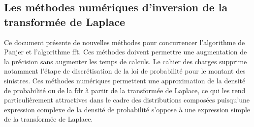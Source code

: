 \subsection{Les méthodes numériques d'inversion de la transformée de Laplace}\label{Chapter1Section1Subsection4}
Ce document présente de nouvelles méthodes pour concurrencer l'algorithme de Panjer et l'algorithme \gls{fft}. Ces méthodes doivent permettre une augmentation de la précision sans augmenter les temps de calculs. Le cahier des charges supprime notamment l'étape de discrétisation de la loi de probabilité pour le montant des sinistres. Ces méthodes numériques permettent une approximation de la densité de probabilité ou de la \gls{fdr} à partir de la transformée de Laplace, ce qui les rend particulièrement attractives dans le cadre des distributions composées puisqu'une expression complexe de la densité de probabilité s'oppose à une expression simple de la transformée de Laplace.\\ 

